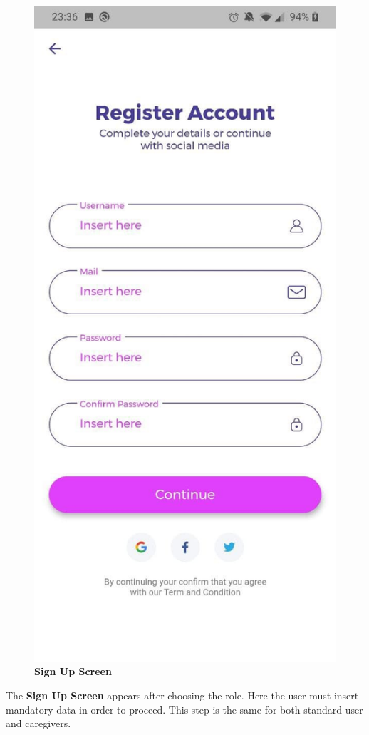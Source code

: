 \documentclass[../../dd.tex]{subfiles}
\begin{document}
    \begin{figure}[H]
        \centering
        \includegraphics[height=.6\textheight]{../../assets/screens/register.jpg}
        \caption{\textbf{Sign Up Screen}}\label{fig:figure}
    \end{figure}
    \begin{center}
        The \textbf{Sign Up Screen} appears after choosing the role.
        Here the user must insert mandatory data in order to proceed.
        This step is the same for both standard user and caregivers.
    \end{center}
\end{document}
